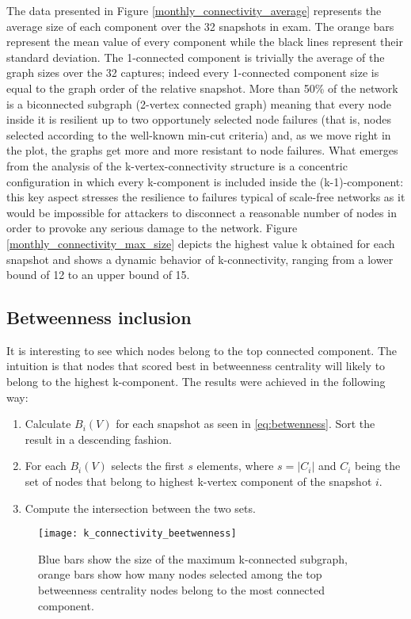 	The data presented in Figure \ref{monthly_connectivity_average} represents the average size of each component over the 32 snapshots in exam. The orange bars represent the mean value of every component while the black lines represent their standard deviation.	The 1-connected component is trivially the average of the graph sizes over the 32 captures; indeed every 1-connected component size is equal to the graph order of the relative snapshot. More than 50\% of the network is a biconnected subgraph (2-vertex connected graph) meaning that every node inside it is resilient up to two opportunely selected node failures (that is, nodes selected according to the well-known min-cut criteria) and, as we move right in the plot, the graphs get more and more resistant to node failures. What emerges from the analysis of the k-vertex-connectivity structure is a concentric configuration in which every k-component is included inside the (k-1)-component: this key aspect stresses the resilience to failures typical of scale-free networks as it would be impossible for attackers to disconnect a reasonable number of nodes in order to provoke any serious damage to the network. Figure \ref{monthly_connectivity_max_size} depicts the highest value k obtained for each snapshot and shows a dynamic behavior of k-connectivity, ranging from a lower bound of 12 to an upper bound of 15.
	
	\subsection{Betweenness inclusion}
	
	It is interesting to see which nodes belong to the top connected component. The intuition is that nodes that scored best in betweenness centrality will likely to belong to the highest k-component. The results were achieved in the following way:
	\begin{enumerate}
		\item Calculate $B_i(V)$ for each snapshot as seen in \ref{eq:betwenness}. Sort the result in a descending fashion. 
		\item For each $B_i(V)$ selects the first $s$ elements, where $s = |C_i|$ and $C_i$ being the set of nodes that belong to highest k-vertex component of the snapshot $i$.
		\item Compute the intersection between the two sets.
	\end{enumerate}
	
	\begin{figure}
		\texttt{[image: k\_connectivity\_beetwenness]}
		\caption{Blue bars show the size of the maximum k-connected subgraph, orange bars show how many nodes selected among the top betweenness centrality nodes belong to the most connected component.}
		\label{monthyl_k_connectivity_betweenness}
	\end{figure}
	
